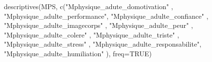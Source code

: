 \documentclass[
]{article}
\newenvironment{Shaded}{\begin{snugshade}}{\end{snugshade}}
\newcommand{\AttributeTok}[1]{\textcolor[rgb]{0.77,0.63,0.00}{#1}}
\newcommand{\ConstantTok}[1]{\textcolor[rgb]{0.00,0.00,0.00}{#1}}
\newcommand{\FunctionTok}[1]{\textcolor[rgb]{0.00,0.00,0.00}{#1}}
\newcommand{\NormalTok}[1]{#1}
\newcommand{\StringTok}[1]{\textcolor[rgb]{0.31,0.60,0.02}{#1}}
\begin{document}
\begin{Shaded}
\begin{Highlighting}[]
\FunctionTok{descriptives}\NormalTok{(MPS, }\FunctionTok{c}\NormalTok{(}\StringTok{"Mphysique\_adute\_domotivation"}\NormalTok{  , }\StringTok{"Mphysique\_adulte\_performance"}\NormalTok{, }
                    \StringTok{"Mphysique\_adulte\_confiance"}\NormalTok{    , }\StringTok{"Mphysique\_adulte\_imagecorps"}\NormalTok{ ,}
                    \StringTok{"Mphysique\_adulte\_peur"}\NormalTok{         , }\StringTok{"Mphysique\_adulte\_colere"}\NormalTok{     ,}
                    \StringTok{"Mphysique\_adulte\_triste"}\NormalTok{       , }\StringTok{"Mphysique\_adulte\_stress"}\NormalTok{     ,}
                    \StringTok{"Mphysique\_adulte\_responsabilite"}\NormalTok{, }\StringTok{"Mphysique\_adulte\_humiliation"}\NormalTok{  ),}
             \AttributeTok{freq=}\ConstantTok{TRUE}\NormalTok{)}
\end{Highlighting}
\end{Shaded}
\end{document}
